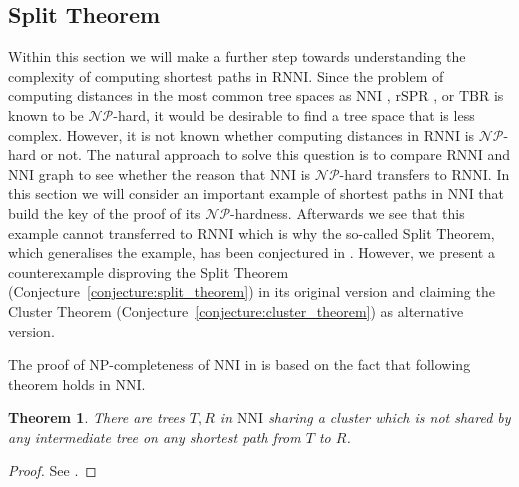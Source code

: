 \documentclass{amsart}
\newcommand{\np}{\mathcal{NP}}
\newcommand{\nni}{\mathrm{NNI}}
\newcommand{\rnni}{\mathrm{RNNI}}
\newcommand{\tbr}{\mathrm{TBR}}
\newcommand{\rspr}{\mathrm{rSPR}}
\newtheorem{theorem}[definition]{Theorem}
\begin{document}
\subsection{Split Theorem}
\label{section:split_theorem}

Within this section we will make a further step towards understanding the complexity of computing shortest paths in $\rnni$.
Since the problem of computing distances in the most common tree spaces as $\nni$ \autocite{Dasgupta2000-xa}, $\rspr$ \autocite{Bordewich2005}, or $\tbr$ \autocite{Allen2001-ky} is known to be $\np$-hard, it would be desirable to find a tree space that is less complex.
However, it is not known whether computing distances in $\rnni$ is $\np$-hard or not.
The natural approach to solve this question is to compare $\rnni$ and $\nni$ graph to see whether the reason that $\nni$ is $\np$-hard transfers to $\rnni$.
In this section we will consider an important example of shortest paths in $\nni$ that build the key of the proof of its $\np$-hardness.
Afterwards we see that this example cannot transferred to $\rnni$ which is why the so-called Split Theorem, which generalises the example, has been conjectured in \autocite{Gavryushkin2018-ol}.
However, we present a counterexample disproving the Split Theorem (Conjecture~\ref{conjecture:split_theorem}) in its original version and claiming the Cluster Theorem (Conjecture~\ref{conjecture:cluster_theorem}) as alternative version.

The proof of NP-completeness of $\nni$ in \autocite{Dasgupta2000-xa} is based on the fact that following theorem holds in $\nni$.

\begin{theorem}
	There are trees $T,R$ in $\nni$ sharing a cluster which is not shared by any intermediate tree on any shortest path from $T$ to $R$.
	\label{thm:split_nni}
\end{theorem}

\begin{proof}
	See \autocite{Li1996-zw}.
\end{proof}
\end{document}
